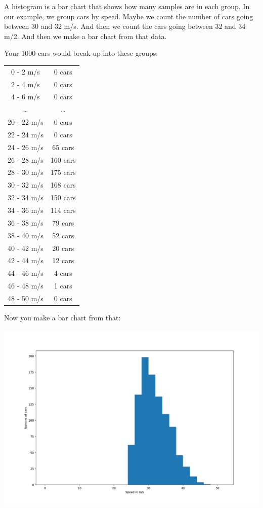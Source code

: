 A histogram is a bar chart that shows how many samples are in each
group. In our example, we group cars by speed. Maybe we count the
number of cars going between 30 and 32 m/s.  And then we count the
cars going between 32 and 34 m/2.  And then we make a bar chart from
that data.

Your 1000 cars would break up into these groups:

\begin{tabular}{ c | c }
0 - 2 m/s & 0 cars \\
2 - 4 m/s & 0 cars \\
4 - 6 m/s & 0 cars \\
\ldots & \ldots \\
20 - 22 m/s & 0 cars \\
22 - 24 m/s & 0 cars \\
24 - 26 m/s & 65 cars \\
26 - 28 m/s & 160 cars \\
28 - 30 m/s & 175 cars \\
30 - 32 m/s & 168 cars \\
32 - 34 m/s & 150 cars \\
34 - 36 m/s & 114 cars \\
36 - 38 m/s & 79 cars \\
38 - 40 m/s & 52 cars \\
40 - 42 m/s & 20 cars \\
42 - 44 m/s & 12 cars \\
44 - 46 m/s & 4 cars \\
46 - 48 m/s & 1 cars \\
48 - 50 m/s & 0 cars \\
\end{tabular}

Now you make a bar chart from that:

\includegraphics[width=\textwidth] {speed_histo.png}

